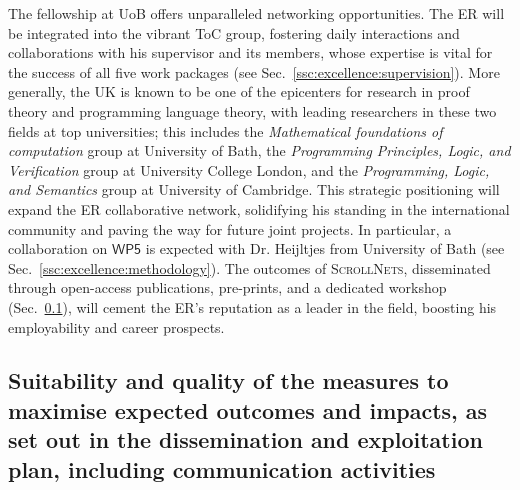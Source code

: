 \documentclass[12pt,draftproposal]{msca-pf}
\newcommand{\proj}{\small\textsc{ScrollNets}}
\newcommand{\WP}[1]{$\mathsf{WP#1}$}
\begin{document}
The fellowship at UoB offers unparalleled networking opportunities. The ER will be integrated into
the vibrant ToC group, fostering daily interactions and collaborations with his supervisor and its
members, whose expertise is vital for the success of all five work packages (see
Sec.~\ref{ssc:excellence:supervision}). More generally, the UK is known to be one of the epicenters
for research in proof theory and programming language theory, with leading researchers in these two
fields at top universities; this includes the \emph{Mathematical foundations of computation} group
at University of Bath, the \emph{Programming Principles, Logic, and Verification} group at
University College London, and the \emph{Programming, Logic, and Semantics} group at University of
Cambridge. This strategic positioning will expand the ER collaborative network, solidifying his
standing in the international community and paving the way for future joint projects. In particular,
a collaboration on \WP{5} is expected with Dr. Heijltjes from University of Bath (see
Sec.~\ref{ssc:excellence:methodology}). The outcomes of {\proj}, disseminated through open-access
publications, pre-prints, and a dedicated workshop (Sec.~\ref{ssc:impact:outcomes}), will cement the
ER's reputation as a leader in the field, boosting his employability and career prospects.

\subsection{Suitability and quality of the measures to maximise expected
    outcomes and impacts, as set out in the dissemination and exploitation plan,
    including communication activities }
\label{ssc:impact:outcomes}
\end{document}
